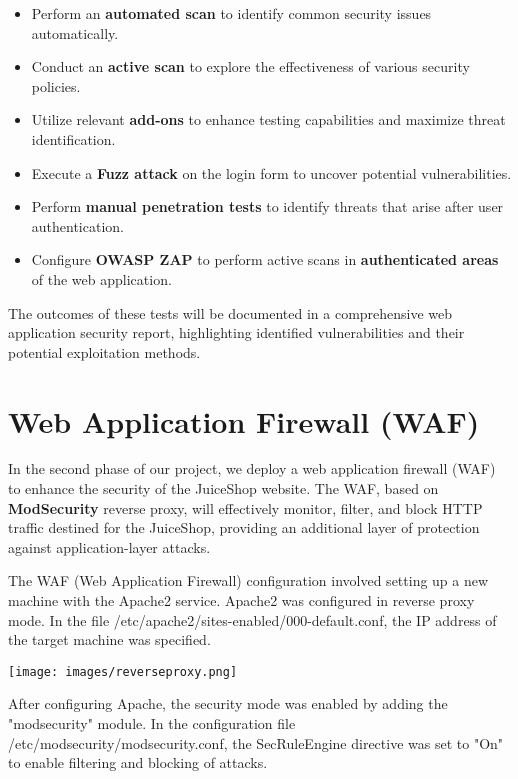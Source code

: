 \documentclass[12pt]{article}
\begin{document}
\begin{itemize}
    \item Perform an \textbf{automated scan} to identify common security issues automatically.
    \item Conduct an \textbf{active scan} to explore the effectiveness of various security policies.
    \item Utilize relevant \textbf{add-ons} to enhance testing capabilities and maximize threat identification.
    \item Execute a \textbf{Fuzz attack} on the login form to uncover potential vulnerabilities.
    \item Perform \textbf{manual penetration tests} to identify threats that arise after user authentication.
    \item Configure \textbf{OWASP ZAP} to perform active scans in \textbf{authenticated areas} of the web application.
\end{itemize}

The outcomes of these tests will be documented in a comprehensive web application security report, highlighting identified vulnerabilities and their potential exploitation methods.

\newpage

\section{Web Application Firewall (WAF)}

In the second phase of our project, we deploy a web application firewall (WAF) to enhance the security of the JuiceShop website. The WAF, based on \textbf{ModSecurity} reverse proxy, will effectively monitor, filter, and block HTTP traffic destined for the JuiceShop, providing an additional layer of protection against application-layer attacks.

The WAF (Web Application Firewall) configuration involved setting up a new machine with the Apache2 service. Apache2 was configured in reverse proxy mode. In the file /etc/apache2/sites-enabled/000-default.conf, the IP address of the target machine was specified.

\begin{center}
    \texttt{[image: images/reverseproxy.png]}
\end{center}


After configuring Apache, the security mode was enabled by adding the "mod\textunderscore security" module. In the configuration file /etc/modsecurity/modsecurity.conf, the SecRuleEngine directive was set to "On" to enable filtering and blocking of attacks.
\end{document}
